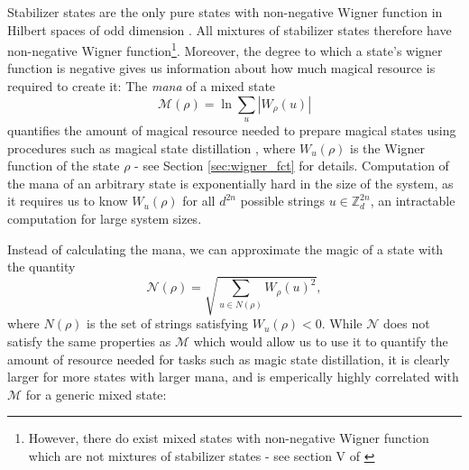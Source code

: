 \documentclass{article}
\begin{document}
Stabilizer states are the only pure states with non-negative Wigner function in Hilbert spaces of odd dimension \cite{Gross_2006}. All mixtures of stabilizer states therefore have non-negative Wigner function\footnote{However, there do exist mixed states with non-negative Wigner function which are not mixtures of stabilizer states - see section V of \cite{Gross_2006}}. Moreover, the degree to which a state's wigner function is negative gives us information about how much magical resource is required to create it: The \textit{mana} of a mixed state
\begin{equation}\mathcal M(\rho)=\ln\sum_{u}\left |W_\rho(u)\right|\end{equation}
quantifies the amount of magical resource needed to prepare magical states using procedures such as magical state distillation \cite{Veitch_2014}, where $W_u(\rho)$ is the Wigner function of the state $\rho$ - see Section \ref{sec:wigner_fct} for details. Computation of the mana of an arbitrary state is exponentially hard in the size of the system, as it requires us to know $W_u(\rho)$ for all $d^{2n}$ possible strings $u\in\mathbb Z_d^{2n}$, an intractable computation for large system sizes. 

Instead of calculating the mana, we can approximate the magic of a state with the quantity
\begin{equation}\mathcal N(\rho)=\sqrt{\sum_{u\in N(\rho)}W_{\rho}(u)^2},\end{equation} where $N(\rho)$ is the set of strings satisfying $W_u(\rho)<0$. While $\mathcal N$ does not satisfy the same properties as $\mathcal M$ which would allow us to use it to quantify the amount of resource needed for tasks such as magic state distillation, it is clearly larger for more states with larger mana, and is emperically highly correlated with $\mathcal M$ for a generic mixed state:
\end{document}

